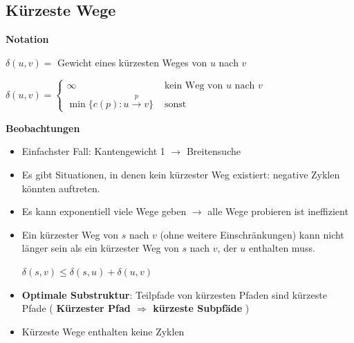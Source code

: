 \vspace{-4pt}
\begin{sectionbox}
\subsection{Kürzeste Wege}\smallskip
\textbf{Notation}\par\smallskip
$\delta(u, v)=$ Gewicht eines kürzesten Weges von $u$ nach $v$\par
$\delta(u, v)=\left\{\begin{array}{ll}
\infty & \text { kein Weg von } u \text { nach } v \\
\min \{c(p): u \stackrel{p}{\longrightarrow} v\} & \text { sonst }
\end{array}\right.$\par\smallskip

\textbf{Beobachtungen}\par
\begin{itemize}
    \item Einfachster Fall: Kantengewicht 1 $\rightarrow$ Breitensuche
    \item Es gibt Situationen, in denen kein kürzester Weg existiert: negative Zyklen könnten auftreten.
    \item Es kann exponentiell viele Wege geben $\rightarrow$  alle Wege probieren ist ineffizient
    \item Ein kürzester Weg von $s$ nach $v$ (ohne weitere Einschränkungen) kann nicht länger sein als ein kürzester Weg von $s$ nach $v$, der $u$ enthalten muss.\par
    \textcolor{tanne}{\textbf{$\delta(s, v) \leq \delta(s, u)+\delta(u, v)$}}
    \item \textbf{Optimale Substruktur}: Teilpfade von kürzesten Pfaden sind kürzeste Pfade ( \textbf{\textcolor{tanne}{Kürzester Pfad $\Rightarrow$ kürzeste Subpfäde}} )
    \item Kürzeste Wege enthalten keine Zyklen
\end{itemize}\par
\end{sectionbox}
\vspace{-4pt}
